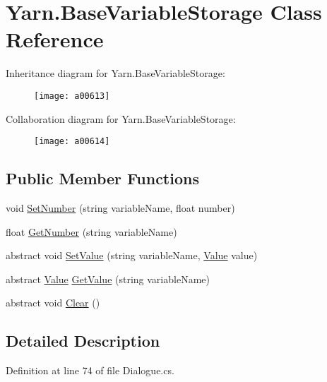 \hypertarget{a00044}{\section{Yarn.\-Base\-Variable\-Storage Class Reference}
\label{a00044}
}


Inheritance diagram for Yarn.\-Base\-Variable\-Storage\-:
\nopagebreak
\begin{figure}[H]
\begin{center}
\leavevmode
\texttt{[image: a00613]}
\end{center}
\end{figure}


Collaboration diagram for Yarn.\-Base\-Variable\-Storage\-:
\nopagebreak
\begin{figure}[H]
\begin{center}
\leavevmode
\texttt{[image: a00614]}
\end{center}
\end{figure}
\subsection*{Public Member Functions}
\begin{DoxyCompactItemize}
\item 
void \hyperlink{a00044_a48b93de9cd7ae61d0cd9583c8330d3ee}{Set\-Number} (string variable\-Name, float number)
\item 
float \hyperlink{a00044_a1b7f7f4468b2463e7b47986d99362279}{Get\-Number} (string variable\-Name)
\item 
abstract void \hyperlink{a00044_a1c57d6d208b78abec0a670396771448e}{Set\-Value} (string variable\-Name, \hyperlink{a00189}{Value} value)
\item 
abstract \hyperlink{a00189}{Value} \hyperlink{a00044_a13b142df804d9842e97e628e252928e8}{Get\-Value} (string variable\-Name)
\item 
abstract void \hyperlink{a00044_a7e45c37f3662ce9f2643e306bb2b3adc}{Clear} ()
\end{DoxyCompactItemize}


\subsection{Detailed Description}


Definition at line 74 of file Dialogue.\-cs.



